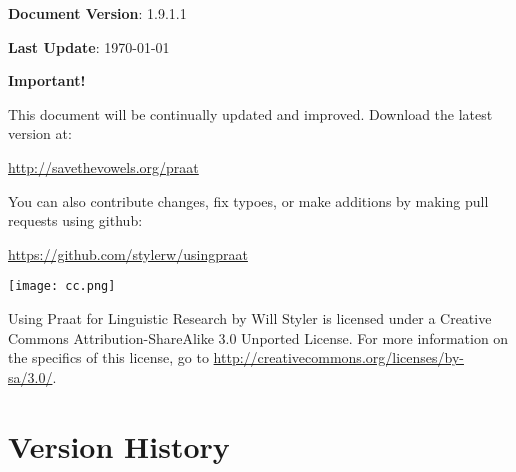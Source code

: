 
\maketitle

\begin{center}
\vspace{0.5in}
\textbf{\small Document Version}: 1.9.1.1

\textbf{Last Update}: \today

\vspace{2.5in}

\textbf{Important!}

This document will be continually updated and improved.  Download the latest version at:

\url{http://savethevowels.org/praat}

You can also contribute changes, fix typoes, or make additions by making pull requests using github:

\url{https://github.com/stylerw/usingpraat}

\vspace{0.5in}

  \centerline{
    \mbox{\texttt{[image: cc.png]}}
  }

Using Praat for Linguistic Research by Will Styler is licensed under a Creative Commons Attribution-ShareAlike 3.0 Unported License.  For more information on the specifics of this license, go to \url{http://creativecommons.org/licenses/by-sa/3.0/}.

\end{center}

\pagebreak

\tableofcontents

\hypertarget{version-history}{%
\section{Version History}\label{version-history}}

